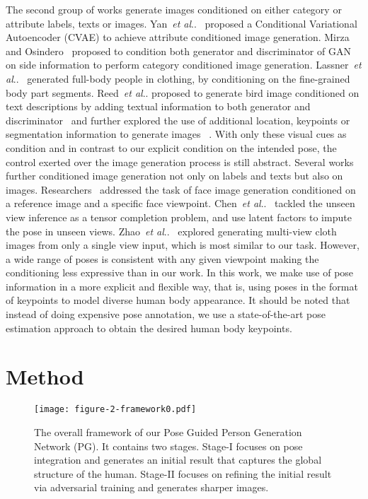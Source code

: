 \documentclass{article}
\makeatletter
\DeclareRobustCommand\onedot{\futurelet\@let@token\@onedot}
\def\@onedot{\ifx\@let@token.\else.\null\fi\xspace}
\def\etal{\emph{et al}\onedot}
\makeatother
\begin{document}
The second group of works generate images conditioned on either category or attribute labels, texts or images. Yan~\etal~\cite{Yan2016-Attribute2Image} proposed a Conditional Variational Autoencoder (CVAE) to achieve attribute conditioned image generation. Mirza and Osindero~\cite{Mirza-conditionalGAN} proposed to condition both generator and discriminator of GAN on side information to perform category conditioned image generation. Lassner~\etal ~\cite{Lassner17ClothNet} generated full-body people in clothing, by conditioning on the fine-grained body part segments. Reed~\etal proposed to generate bird image conditioned on text descriptions by adding textual information to both generator and discriminator~\cite{Reed-ICML16} and further explored the use of additional location, keypoints or segmentation information to generate images ~\cite{Reed-NIPS2016,reed2016-techreport}. 
With only these visual cues as condition and in contrast to our explicit condition on the intended pose, the control exerted over the image generation process is still abstract.
Several works further conditioned image generation not only on labels and texts but also on images. Researchers~\cite{Yim-CVPR15, Yang-NIPS15, Jia-BMVC16, Huang-faceRotation} addressed the task of face image generation conditioned on a reference image and a specific face viewpoint. 
Chen~\etal~\cite{chen2014inferring} tackled the unseen view inference as a tensor completion problem, and use latent factors to impute the pose in unseen views.
Zhao~\etal~\cite{Zhao-Arxiv16-Multiview} explored generating multi-view cloth images from only a single view input, which is most similar to our task. 
However, a wide range of poses is consistent with any given viewpoint making the conditioning less expressive than in our work. 
In this work, we make use of pose information in a more explicit and flexible way, that is, using poses in the format of keypoints to model diverse human body appearance. It should be noted that instead of doing expensive pose annotation, we use a state-of-the-art pose estimation approach to obtain the desired human body keypoints.
 \section{Method}
\label{method}

\begin{figure*}
  \centering
  \texttt{[image: figure-2-framework0.pdf]}\\
  \caption{The overall framework of our Pose Guided Person Generation Network (PG). It contains two stages. Stage-I focuses on pose integration and generates an initial result that captures the global structure of the human. Stage-II focuses on refining the initial result via adversarial training and generates sharper images.}  

\label{figure-framework}
\end{figure*}
\end{document}
